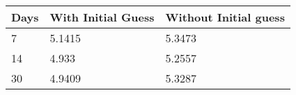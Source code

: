 \begin{tabular}{lll}
Days & With Initial Guess & Without Initial guess \\ 
\hline 
7 & 5.1415 & 5.3473 \\ 
14 & 4.933 & 5.2557 \\ 
30 & 4.9409 & 5.3287 \\ 
\hline 
\end{tabular}